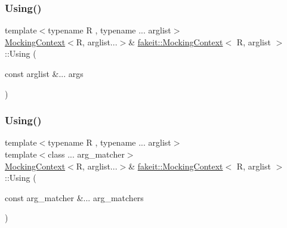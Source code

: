 \subsubsection{\texorpdfstring{Using()}{Using()}\hspace{0.1cm}{\footnotesize\ttfamily [12/18]}}
{\footnotesize\ttfamily template$<$typename R , typename ... arglist$>$ \\
\mbox{\hyperlink{classfakeit_1_1MockingContext}{Mocking\+Context}}$<$R, arglist...$>$\& \mbox{\hyperlink{classfakeit_1_1MockingContext}{fakeit\+::\+Mocking\+Context}}$<$ R, arglist $>$\+::Using (\begin{DoxyParamCaption}\item[{const arglist \&...}]{args }\end{DoxyParamCaption})\hspace{0.3cm}{\ttfamily [inline]}}

\mbox{\label{classfakeit_1_1MockingContext_acb9bd9b011ac2ad88c8d08eebfa101ac}} 
\subsubsection{\texorpdfstring{Using()}{Using()}\hspace{0.1cm}{\footnotesize\ttfamily [13/18]}}
{\footnotesize\ttfamily template$<$typename R , typename ... arglist$>$ \\
template$<$class ... arg\+\_\+matcher$>$ \\
\mbox{\hyperlink{classfakeit_1_1MockingContext}{Mocking\+Context}}$<$R, arglist...$>$\& \mbox{\hyperlink{classfakeit_1_1MockingContext}{fakeit\+::\+Mocking\+Context}}$<$ R, arglist $>$\+::Using (\begin{DoxyParamCaption}\item[{const arg\+\_\+matcher \&...}]{arg\+\_\+matchers }\end{DoxyParamCaption})\hspace{0.3cm}{\ttfamily [inline]}}

\mbox{\label{classfakeit_1_1MockingContext_acb9bd9b011ac2ad88c8d08eebfa101ac}} 
